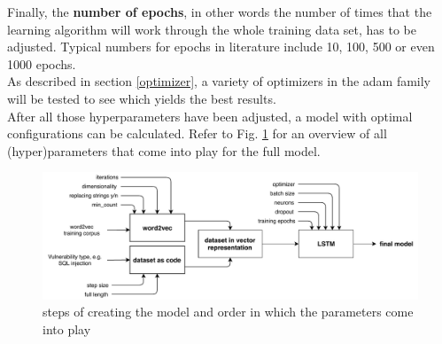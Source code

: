 \documentclass[
	a4paper,
	pagesize,
	pdftex,
	12pt,
	twoside, %
	BCOR=5mm, %
	ngerman,
	fleqn,
	final,
	]{scrartcl}
\begin{document}
Finally, the \textbf{number of epochs}, in other words the number of times that the learning algorithm will work through the whole training data set, has to be adjusted. Typical numbers for epochs in literature include 10, 100, 500 or even 1000 epochs.\\
As described in section \ref{optimizer}, a variety of optimizers in the adam family will be tested to see which yields the best results.\\
After all those hyperparameters have been adjusted, a model with optimal configurations can be calculated. Refer to Fig. \ref{fig:parameters} for an overview of all (hyper)parameters that come into play for the full model.

\begin{figure}[h]
	\centering
	\includegraphics[width=\linewidth]{img/Parameters}
	\caption{steps of creating the model and order in which the parameters come into play}
	\label{fig:parameters}
\end{figure}
\end{document}
